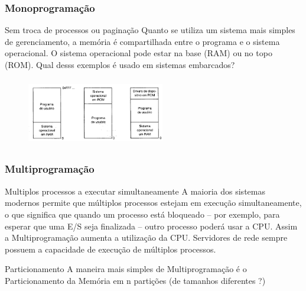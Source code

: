 \documentclass[11pt]{beamer}
\begin{document}
\begin{frame}\frametitle{ Monoprogramação}

\begin{block}{ Sem troca de processos ou paginação}
\pause
  Quanto se utiliza um sistema mais simples de gerenciamento, a memória é compartilhada entre o programa e o sistema operacional.
  O sistema operacional pode estar na base (RAM) ou no topo (ROM). Qual desss exemplos é usado em sistemas embarcados?
\pause
  \begin{figure}[h]
    \includegraphics[width=60mm, height=30mm]{Figuras/SistemaMemSimples.png}\\
  \end{figure}
\end{block}

\end{frame}


\begin{frame}\frametitle{ Multiprogramação}

\begin{exampleblock}{ Multiplos processos a executar simultaneamente}
  A maioria dos sistemas modernos permite que múltiplos processos estejam em execução simultaneamente, o que significa que 
  quando um processo está bloqueado -- por exemplo, para esperar que uma E/S seja finalizada -- outro processo poderá usar a CPU.
\pause
  Assim a Multiprogramação aumenta a utilização da CPU. Servidores de rede sempre possuem a capacidade de execução de múltiplos 
  processos.
\end{exampleblock}

\pause
\begin{alertblock}{ Particionamento}
  A maneira mais simples de Multiprogramação é o Particionamento da Memória em n partições (de tamanhos diferentes ?)
\end{alertblock}
\end{frame}
\end{document}

